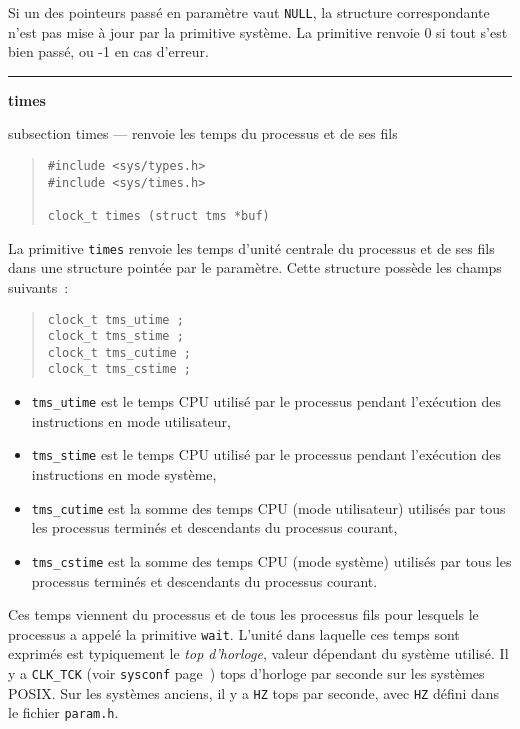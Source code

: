 \documentclass [twoside] {report}
\newcommand {\primitive} [1]
    {
	{\large \bf #1}
	\addcontentsline {toc} {subsection} {#1}
    }
\newcommand {\separation}
    {
	\vspace {7mm}
	\nopagebreak
	\hrule
    }
\begin{document}
Si un des pointeurs passé en paramètre vaut \texttt {NULL}, la structure
correspondante n'est pas mise à jour par la primitive système. La
primitive renvoie 0 si tout s'est bien passé, ou -1 en cas d'erreur.


\separation
\primitive {times} --- renvoie les temps du processus et de ses fils

\begin {quote}
\begin {verbatim}
#include <sys/types.h>
#include <sys/times.h>

clock_t times (struct tms *buf)
\end{verbatim}
\end {quote}

La primitive {\tt times} renvoie les temps d'unité centrale du processus
et de ses fils dans une structure pointée par le paramètre.  Cette
structure possède les champs suivants~:

\begin {quote}
\begin {verbatim}
clock_t tms_utime ;
clock_t tms_stime ;
clock_t tms_cutime ;
clock_t tms_cstime ;
\end{verbatim}
\end {quote}

\begin {itemize}
    \item {\tt tms\_utime} est le temps CPU utilisé par le processus
	pendant l'exécution des instructions en mode utilisateur,

    \item {\tt tms\_stime} est le temps CPU utilisé par le processus
	pendant l'exécution des instructions en mode système,

    \item {\tt tms\_cutime} est la somme des temps CPU (mode
	utilisateur) utilisés par tous les processus terminés et
	descendants du processus courant,

    \item {\tt tms\_cstime} est la somme des temps CPU (mode système)
	utilisés par tous les processus terminés et descendants du
	processus courant.
\end {itemize}

Ces temps viennent du processus et de tous les processus fils pour
lesquels le processus a appelé la primitive {\tt wait}. L'unité dans
laquelle ces temps sont exprimés est typiquement le {\em top d'horloge},
valeur dépendant du système utilisé.
Il y a {\tt CLK\_TCK} (voir {\tt sysconf} page~\pageref {sysconf}) tops
d'horloge par seconde sur les systèmes POSIX. Sur les systèmes anciens,
il y a {\tt HZ} tops par seconde, avec {\tt HZ} défini dans le fichier
{\tt param.h}.
\end{document}
